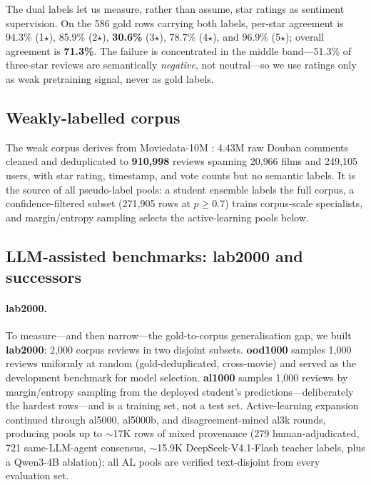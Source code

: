 The dual labels let us measure, rather than assume, star ratings as
sentiment supervision. On the 586 gold rows carrying both labels,
per-star agreement is 94.3\% (1$\star$), 85.9\% (2$\star$),
\textbf{30.6\%} (3$\star$), 78.7\% (4$\star$), and 96.9\% (5$\star$);
overall agreement is \textbf{71.3\%}. The failure is concentrated in
the middle band---51.3\% of three-star reviews are semantically
\emph{negative}, not neutral---so we use ratings only as weak
pretraining signal, never as gold labels.

\subsection{Weakly-labelled corpus}

The weak corpus derives from Moviedata-10M \citep{moviedata10m}: 4.43M
raw Douban comments cleaned and deduplicated to \textbf{910{,}998}
reviews spanning 20{,}966 films and 249{,}105 users, with star rating,
timestamp, and vote counts but no semantic labels. It is the source of
all pseudo-label pools: a student ensemble labels the full corpus, a
confidence-filtered subset (271{,}905 rows at $p \ge 0.7$) trains
corpus-scale specialists, and margin/entropy sampling selects the
active-learning pools below.

\subsection{LLM-assisted benchmarks: lab2000 and successors}

\paragraph{lab2000.} To measure---and then narrow---the
gold-to-corpus generalisation gap, we built \textbf{lab2000}: 2{,}000
corpus reviews in two disjoint subsets. \textbf{ood1000} samples
1{,}000 reviews uniformly at random (gold-deduplicated, cross-movie)
and served as the development benchmark for model selection.
\textbf{al1000} samples 1{,}000 reviews by margin/entropy sampling
from the deployed student's predictions---deliberately the hardest
rows---and is a training set, not a test set. Active-learning expansion
continued through al5000, al5000b, and disagreement-mined al3k rounds,
producing pools up to $\sim$17K rows of mixed provenance (279
human-adjudicated, 721 same-LLM-agent consensus, $\sim$15.9K
DeepSeek-V4.1-Flash teacher labels, plus a Qwen3-4B ablation); all AL
pools are verified text-disjoint from every evaluation set.

